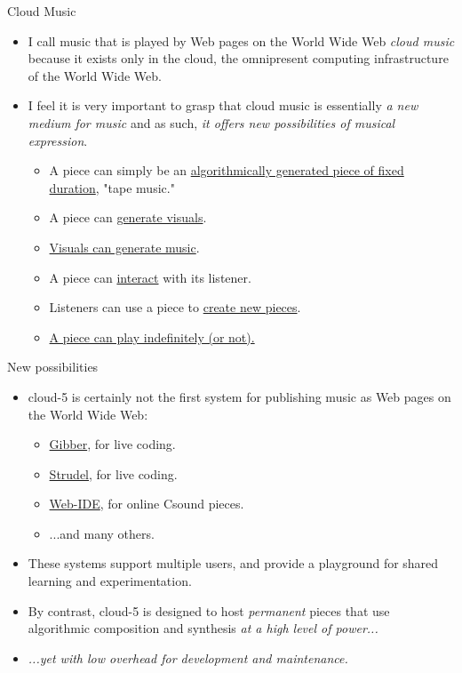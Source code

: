 \documentclass{beamer}
\begin{document}
\begin{frame}{Cloud Music}
\begin{itemize}
\item I call music that is played by Web pages on the World Wide Web \emph{cloud music} because it exists only in the cloud, the omnipresent computing infrastructure of the World Wide Web.
\item I feel it is very important to grasp that cloud music is essentially \emph{a new medium for music} and as such,\emph{ it offers new possibilities of musical expression}.
\begin{itemize}
\item A piece can simply be an \href{http://localhost:8000/cloud5-example-score-generator.html}{algorithmically generated piece of fixed duration}, "tape music."
\item A piece can \href{http://localhost:8000/cloud_music_no_2.html}{generate visuals}.
\item \href{http://localhost:8000/cloud_music_no_1.html}{Visuals can generate music}.
\item A piece can \href{http://localhost:8000/cloud5-example-visual-music.html}{interact} with its listener.
\item Listeners can use a piece to \href{http://localhost:8000/cancycle.html}{create new pieces}.
\item \href{http://localhost:8000/cancycle.html}{A piece can play indefinitely (or not).}
\end{itemize}
\end{itemize}
\end{frame}

\begin{frame}{New possibilities}
\begin{itemize}
\item cloud-5 is certainly not the first system for publishing music as Web pages on the World Wide Web:
\begin{itemize}
\item \href{https://gibber.cc/playground/}{Gibber}, for live coding.
\item \href{https://strudel.cc/}{Strudel}, for live coding.
\item \href{https://ide.csound.com/}{Web-IDE}, for online Csound pieces.
\item ...and many others.
\end{itemize}
\item These systems support multiple users, and provide a playground for shared learning and experimentation.
\item By contrast, cloud-5 is designed to host \emph{permanent} pieces that use algorithmic composition and synthesis \emph{at a high level of power...}
\item\emph{ ...yet with low overhead for development and maintenance.}
\end{itemize}
\end{frame}
\end{document}
